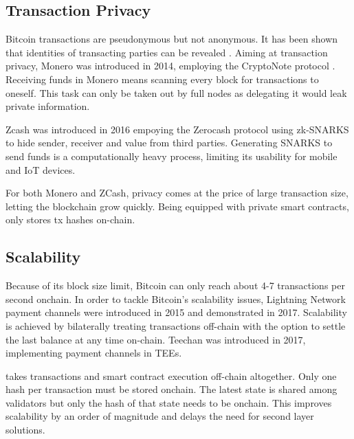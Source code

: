 \documentclass[conference]{IEEEtran}
\begin{document}
\subsection{Transaction Privacy}
Bitcoin transactions are pseudonymous but not anonymous. It has been shown that identities of transacting parties can be revealed \cite{reid12}. Aiming at transaction privacy, Monero was introduced in 2014, employing the CryptoNote protocol \cite{saberhagen14}. Receiving funds in Monero means scanning every block for transactions to oneself. This task can only be taken out by full nodes as delegating it would leak private information. 

Zcash was introduced in 2016 empoying the Zerocash protocol \cite{bensasson14} using zk-SNARKS to hide sender, receiver and value from third parties. Generating SNARKS to send funds is a computationally heavy process, limiting its usability for mobile and IoT devices.

For both Monero and ZCash, privacy comes at the price of large transaction size, letting the blockchain grow quickly.
Being equipped with private smart contracts, \encointer only stores tx hashes on-chain. 
 
\subsection{Scalability}
Because of its block size limit, Bitcoin can only reach about 4-7 transactions per second onchain. 
In order to tackle Bitcoin's scalability issues, Lightning Network payment channels \cite{poon15} were introduced in 2015 and demonstrated in 2017. Scalability is achieved by bilaterally treating transactions off-chain with the option to settle the last balance at any time on-chain. Teechan \cite{lind17} was introduced in 2017, implementing payment channels in TEEs. 

\encointer takes transactions and smart contract execution off-chain altogether. Only one hash per transaction must be stored onchain. The latest state is shared among validators but only the hash of that state needs to be onchain. This improves scalability by an order of magnitude and delays the need for second layer solutions. 
\end{document}
